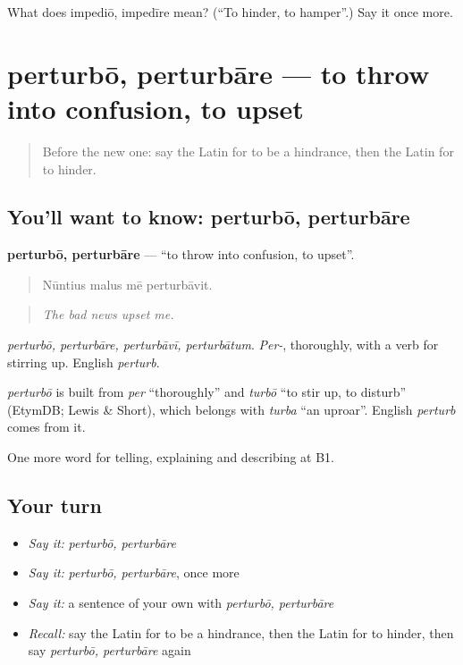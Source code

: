\begin{tcolorbox}[breakable,colback=teal!4,colframe=teal!35!black,title={Before you move on}]
What does impediō, impedīre mean? (\textquotedblleft{}To hinder, to hamper\textquotedblright{}.) Say it once more.
\end{tcolorbox}
\section[perturbō, perturbāre]{perturbō, perturbāre — to throw into confusion, to upset}

\label{lesson:LA-C374-perturbo}



\begin{quote}
Before the new one: say the Latin for to be a hindrance, then the Latin for to hinder.
\end{quote}

\subsection*{You'll want to know: perturbō, perturbāre}
\textbf{perturbō, perturbāre} — \textquotedblleft{}to throw into confusion, to upset\textquotedblright{}.

\begin{quote}
Nūntius malus mē perturbāvit.
\end{quote}

\begin{quote}
\emph{The bad news upset me.}
\end{quote}

\emph{perturbō, perturbāre, perturbāvī, perturbātum}. \emph{Per-}, thoroughly, with a verb for stirring up. English \emph{perturb}.

\begin{cousinweb}
\emph{perturbō} is built from \emph{per} \textquotedblleft{}thoroughly\textquotedblright{} and \emph{turbō} \textquotedblleft{}to stir up, to disturb\textquotedblright{} (EtymDB; Lewis \& Short), which belongs with \emph{turba} \textquotedblleft{}an uproar\textquotedblright{}. English \emph{perturb} comes from it.
\end{cousinweb}

\begin{grammarlens}[title={What you've built}]
One more word for telling, explaining and describing at B1.
\end{grammarlens}

\subsection*{Your turn}
\begin{itemize}
\raggedright
  \item \emph{Say it:} \emph{perturbō, perturbāre}
  \item \emph{Say it:} \emph{perturbō, perturbāre}, once more
  \item \emph{Say it:} a sentence of your own with \emph{perturbō, perturbāre}
  \item \emph{Recall:} say the Latin for to be a hindrance, then the Latin for to hinder, then say \emph{perturbō, perturbāre} again
\end{itemize}


